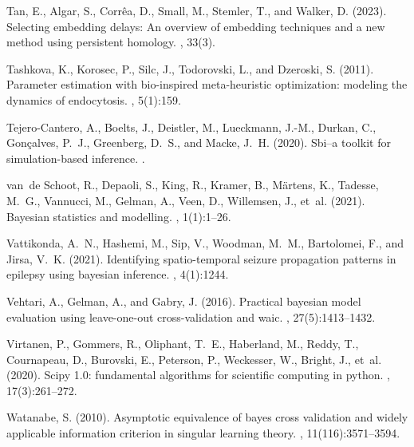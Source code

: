 \documentclass[12pt]{article}
\begin{document}
\begin{thebibliography}{}
Tan, E., Algar, S., Corr{\^e}a, D., Small, M., Stemler, T., and Walker, D.
  (2023).
\newblock Selecting embedding delays: An overview of embedding techniques and a
  new method using persistent homology.
,
  33(3).

Tashkova, K., Korosec, P., Silc, J., Todorovski, L., and Dzeroski, S. (2011).
\newblock Parameter estimation with bio-inspired meta-heuristic optimization:
  modeling the dynamics of endocytosis.
, 5(1):159.

Tejero-Cantero, A., Boelts, J., Deistler, M., Lueckmann, J.-M., Durkan, C.,
  Gon{\c{c}}alves, P.~J., Greenberg, D.~S., and Macke, J.~H. (2020).
\newblock Sbi--a toolkit for simulation-based inference.
.

van~de Schoot, R., Depaoli, S., King, R., Kramer, B., M{\"a}rtens, K., Tadesse,
  M.~G., Vannucci, M., Gelman, A., Veen, D., Willemsen, J., et~al. (2021).
\newblock Bayesian statistics and modelling.
, 1(1):1--26.

Vattikonda, A.~N., Hashemi, M., Sip, V., Woodman, M.~M., Bartolomei, F., and
  Jirsa, V.~K. (2021).
\newblock Identifying spatio-temporal seizure propagation patterns in epilepsy
  using bayesian inference.
, 4(1):1244.

Vehtari, A., Gelman, A., and Gabry, J. (2016).
\newblock Practical bayesian model evaluation using leave-one-out
  cross-validation and waic.
, 27(5):1413--1432.

Virtanen, P., Gommers, R., Oliphant, T.~E., Haberland, M., Reddy, T.,
  Cournapeau, D., Burovski, E., Peterson, P., Weckesser, W., Bright, J., et~al.
  (2020).
\newblock Scipy 1.0: fundamental algorithms for scientific computing in python.
, 17(3):261--272.

Watanabe, S. (2010).
\newblock Asymptotic equivalence of bayes cross validation and widely
  applicable information criterion in singular learning theory.
, 11(116):3571--3594.


\end{thebibliography}
\end{document}
